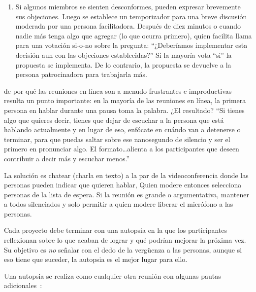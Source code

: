 \begin{enumerate}
\item
  Si algunos miembros se sienten desconformes, pueden expresar brevemente sus objeciones.
  Luego se establece un temporizador para una breve discusión moderada por una persona facilitadora.
  Después de diez minutos o cuando nadie más tenga algo que agregar (lo que ocurra primero),
  quien facilita llama para una votación si-o-no sobre la pregunta:
  ``¿Deberíamos implementar esta decisión aun con las objeciones establecidas?''
  Si la mayoría vota ``si'' la propuesta se implementa.
  De lo contrario, la propuesta se devuelve a la persona patrocinadora para trabajarla más.

\end{enumerate}


de por qué las reuniones en línea son a menudo frustrantes e improductivas 
resulta un punto importante:
en la mayoría de las reuniones en línea,
la primera persona en hablar durante una pausa toma la palabra.
¿El resultado?
``Si tienes algo que quieres decir,
tienes que dejar de escuchar a la persona que está hablando actualmente
y en lugar de eso, enfócate en cuándo van a detenerse o terminar, 
para que puedas saltar sobre ese nanosegundo de silencio y ser el primero en pronunciar algo.
El formato{\ldots}alienta a los participantes que deseen contribuir a decir más y escuchar menos.''

La solución es chatear (charla en texto) a la par de la videoconferencia
donde las personas pueden indicar que quieren hablar,
Quien modere entonces selecciona personas de la lista de espera.
Si la reunión es grande o argumentativa,
mantener a todos silenciados
y solo permitir a quien modere liberar el micrófono a las personas.


Cada proyecto debe terminar con una autopsia
en la que los participantes reflexionan sobre lo que acaban de lograr
y qué podrían mejorar la próxima vez.
Su objetivo es \emph{no} señalar con el dedo de la vergüenza a las personas,
aunque si eso tiene que suceder,
la autopsia es el mejor lugar para ello.

Una autopsia se realiza como cualquier otra reunión
con algunas pautas adicionales~\cite{Derb2006}:

